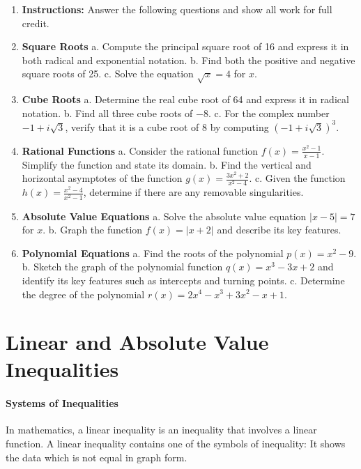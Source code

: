 \begin{enumerate}
    \item \textbf{Instructions:} Answer the following questions and show all work for full credit.
    \item \textbf{Square Roots} a. Compute the principal square root of 16 and express it in both radical and exponential notation. b. Find both the positive and negative square roots of 25. c. Solve the equation $\sqrt{x} = 4$ for $x$.
    \item \textbf{Cube Roots} a. Determine the real cube root of 64 and express it in radical notation. b. Find all three cube roots of $-8$. c. For the complex number $-1 + i\sqrt{3}$, verify that it is a cube root of 8 by computing $(-1 + i\sqrt{3})^3$.
    \item \textbf{Rational Functions} a. Consider the rational function $f(x) = \frac{x^{2} - 1}{x - 1}$. Simplify the function and state its domain. b. Find the vertical and horizontal asymptotes of the function $g(x) = \frac{3x^{2} + 2}{x^{2} - 4}$. c. Given the function $h(x) = \frac{x^{2} - 4}{x^{2} - 1}$, determine if there are any removable singularities.
    \item \textbf{Absolute Value Equations} a. Solve the absolute value equation $|x - 5| = 7$ for $x$. b. Graph the function $f(x) = |x + 2|$ and describe its key features.
    \item \textbf{Polynomial Equations} a. Find the roots of the polynomial $p(x) = x^{2} - 9$. b. Sketch the graph of the polynomial function $q(x) = x^{3} - 3x + 2$ and identify its key features such as intercepts and turning points. c. Determine the degree of the polynomial $r(x) = 2x^{4} - x^{3} + 3x^{2} - x + 1$.
\end{enumerate}

\section{Linear and Absolute Value Inequalities}
\label{sec:linear-and-absolute-value-inequalities}

\paragraph{Systems of Inequalities}



In mathematics, a linear inequality is an inequality that involves a linear function. A linear inequality contains one of the symbols of inequality: It shows the data which is not equal in graph form.



